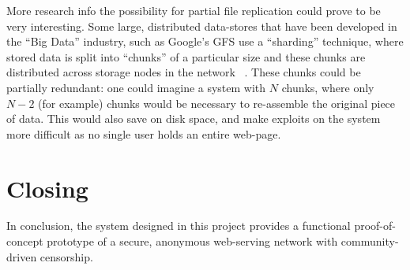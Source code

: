 More research info the possibility for partial file replication could prove to be
very interesting. Some large, distributed data-stores that have been developed in the
``Big Data'' industry, such as Google's GFS use a ``sharding'' technique, where stored data
is split into ``chunks'' of a particular size and these chunks are distributed across storage
nodes in the network ~\cite{gfs}. These chunks could be partially redundant: one could imagine a system with
$N$ chunks, where only $N-2$ (for example) chunks would be necessary to re-assemble
the original piece of data. This would also save on disk space, and make exploits
on the system more difficult as no single user holds an entire web-page.

\section{Closing}

In conclusion, the system designed in this project provides a functional
proof-of-concept prototype of a secure, anonymous web-serving network with community-driven
censorship.
